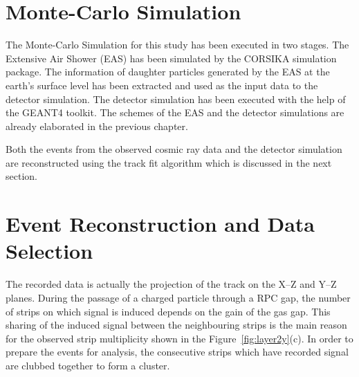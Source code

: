 \section{Monte-Carlo Simulation}
The Monte-Carlo Simulation for this study has been executed in
two stages. The Extensive Air Shower (EAS) has been simulated
by the CORSIKA simulation package\cite{corsika763}. The information
of daughter particles generated by the EAS at the earth's surface
level has been extracted and used as the input data to the detector
simulation. The detector simulation has been executed with the help
of the GEANT4 toolkit\cite{geant4}. The schemes of the EAS and the
detector simulations are already elaborated in the previous chapter.

Both the events from the observed cosmic ray data and the detector
simulation are reconstructed using the track fit algorithm which is
discussed in the next section.

\section{Event Reconstruction and Data Selection}
The recorded data is actually the projection of the track on the
\mbox{X--Z} and \mbox{Y--Z} planes. During the passage of a charged
particle through a RPC gap, the number of strips on which signal is
induced depends on the gain of the gas gap. This sharing of the induced
signal between the neighbouring strips is the main reason for the
observed strip multiplicity shown in the Figure~\ref{fig:layer2y}(c).
In order to prepare the events for analysis, the consecutive strips
which have recorded signal are clubbed together to form a cluster.

